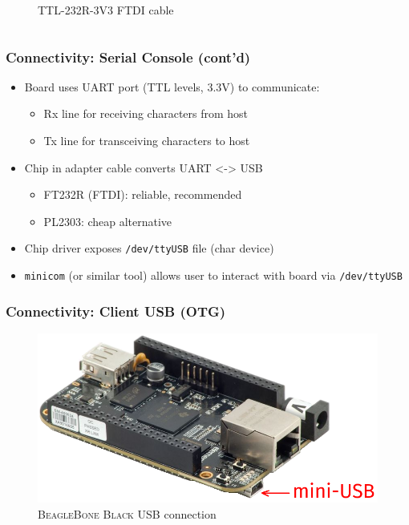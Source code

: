 \documentclass[aspectratio=169]{beamer}
\begin{document}
\begin{frame}
\begin{columns}
\begin{figure}
      \caption{TTL-232R-3V3 FTDI cable}
    \end{figure}
  \end{columns}
\end{frame}

\begin{frame}
  \frametitle{Connectivity: Serial Console (cont'd)}
  \begin{itemize}
    \item Board uses UART port (TTL levels, 3.3V) to communicate:
    \begin{itemize}
      \item Rx line for receiving characters from host
      \item Tx line for transceiving characters to host
    \end{itemize}
    \item Chip in adapter cable converts UART <-> USB
    \begin{itemize}
      \item FT232R (FTDI): reliable, recommended
      \item PL2303: cheap alternative
    \end{itemize}
    \item Chip driver exposes \texttt{/dev/ttyUSB} file (char device)
    \item \texttt{minicom} (or similar tool) allows user to interact with board
          via \texttt{/dev/ttyUSB}
  \end{itemize}
\end{frame}

\begin{frame}
  \frametitle{Connectivity: Client USB (OTG)}
  \begin{figure}
    \centering
    \includegraphics[scale=0.4]{images/bbb-otg.png}
    \caption{\textsc{BeagleBone Black} USB connection}
  \end{figure}
\end{frame}
\end{document}
